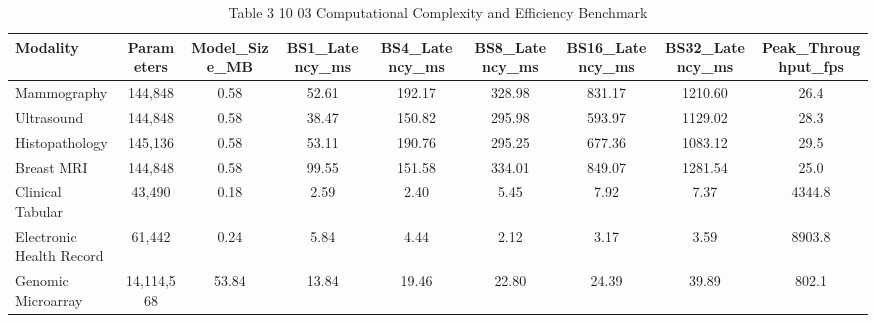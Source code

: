 \begin{table}[htbp]
\centering
\small
\begin{tabular}{lcccccccc}
\hline
Modality & Parameters & Model\_Size\_MB & BS1\_Latency\_ms & BS4\_Latency\_ms & BS8\_Latency\_ms & BS16\_Latency\_ms & BS32\_Latency\_ms & Peak\_Throughput\_fps \\
\hline
Mammography & 144,848 & 0.58 & 52.61 & 192.17 & 328.98 & 831.17 & 1210.60 & 26.4 \\
Ultrasound & 144,848 & 0.58 & 38.47 & 150.82 & 295.98 & 593.97 & 1129.02 & 28.3 \\
Histopathology & 145,136 & 0.58 & 53.11 & 190.76 & 295.25 & 677.36 & 1083.12 & 29.5 \\
Breast MRI & 144,848 & 0.58 & 99.55 & 151.58 & 334.01 & 849.07 & 1281.54 & 25.0 \\
Clinical Tabular & 43,490 & 0.18 & 2.59 & 2.40 & 5.45 & 7.92 & 7.37 & 4344.8 \\
Electronic Health Record & 61,442 & 0.24 & 5.84 & 4.44 & 2.12 & 3.17 & 3.59 & 8903.8 \\
Genomic Microarray & 14,114,568 & 53.84 & 13.84 & 19.46 & 22.80 & 24.39 & 39.89 & 802.1 \\
\hline
\end{tabular}
\caption{Table 3 10 03 Computational Complexity and Efficiency Benchmark}
\label{tab:table_3_10_03_computational_complexity_and_efficiency_benchmark}
\end{table}
